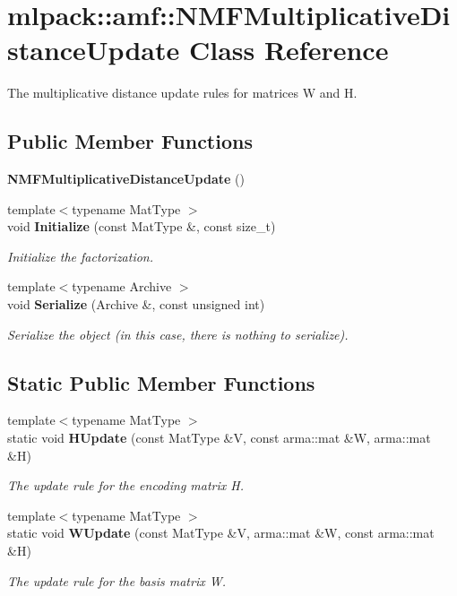 \section{mlpack\+:\+:amf\+:\+:N\+M\+F\+Multiplicative\+Distance\+Update Class Reference}
\label{classmlpack_1_1amf_1_1NMFMultiplicativeDistanceUpdate}


The multiplicative distance update rules for matrices W and H.  


\subsection*{Public Member Functions}
\begin{DoxyCompactItemize}
\item 
{\bf N\+M\+F\+Multiplicative\+Distance\+Update} ()
\item 
{\footnotesize template$<$typename Mat\+Type $>$ }\\void {\bf Initialize} (const Mat\+Type \&, const size\+\_\+t)
\begin{DoxyCompactList}\small\item\em Initialize the factorization. \end{DoxyCompactList}\item 
{\footnotesize template$<$typename Archive $>$ }\\void {\bf Serialize} (Archive \&, const unsigned int)
\begin{DoxyCompactList}\small\item\em Serialize the object (in this case, there is nothing to serialize). \end{DoxyCompactList}\end{DoxyCompactItemize}
\subsection*{Static Public Member Functions}
\begin{DoxyCompactItemize}
\item 
{\footnotesize template$<$typename Mat\+Type $>$ }\\static void {\bf H\+Update} (const Mat\+Type \&V, const arma\+::mat \&W, arma\+::mat \&H)
\begin{DoxyCompactList}\small\item\em The update rule for the encoding matrix H. \end{DoxyCompactList}\item 
{\footnotesize template$<$typename Mat\+Type $>$ }\\static void {\bf W\+Update} (const Mat\+Type \&V, arma\+::mat \&W, const arma\+::mat \&H)
\begin{DoxyCompactList}\small\item\em The update rule for the basis matrix W. \end{DoxyCompactList}\end{DoxyCompactItemize}


